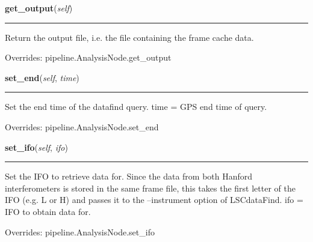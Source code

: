     \label{power:DataFindNode:get_output}
    \vspace{0.5ex}

    \begin{boxedminipage}{\textwidth}

    \raggedright \textbf{get\_output}(\textit{self})

    \vspace{-1.5ex}

    \rule{\textwidth}{0.5\fboxrule}
    Return the output file, i.e. the file containing the frame cache 
    data.

    \vspace{1ex}

      Overrides: pipeline.AnalysisNode.get\_output

    \end{boxedminipage}

    \label{power:DataFindNode:set_end}
    \vspace{0.5ex}

    \begin{boxedminipage}{\textwidth}

    \raggedright \textbf{set\_end}(\textit{self}, \textit{time})

    \vspace{-1.5ex}

    \rule{\textwidth}{0.5\fboxrule}
    Set the end time of the datafind query. time = GPS end time of query.

    \vspace{1ex}

      Overrides: pipeline.AnalysisNode.set\_end

    \end{boxedminipage}

    \label{power:DataFindNode:set_ifo}
    \vspace{0.5ex}

    \begin{boxedminipage}{\textwidth}

    \raggedright \textbf{set\_ifo}(\textit{self}, \textit{ifo})

    \vspace{-1.5ex}

    \rule{\textwidth}{0.5\fboxrule}
    Set the IFO to retrieve data for. Since the data from both Hanford 
    interferometers is stored in the same frame file, this takes the 
    first letter of the IFO (e.g. L or H) and passes it to the 
    --instrument option of LSCdataFind. ifo = IFO to obtain data for.

    \vspace{1ex}

      Overrides: pipeline.AnalysisNode.set\_ifo

    \end{boxedminipage}


